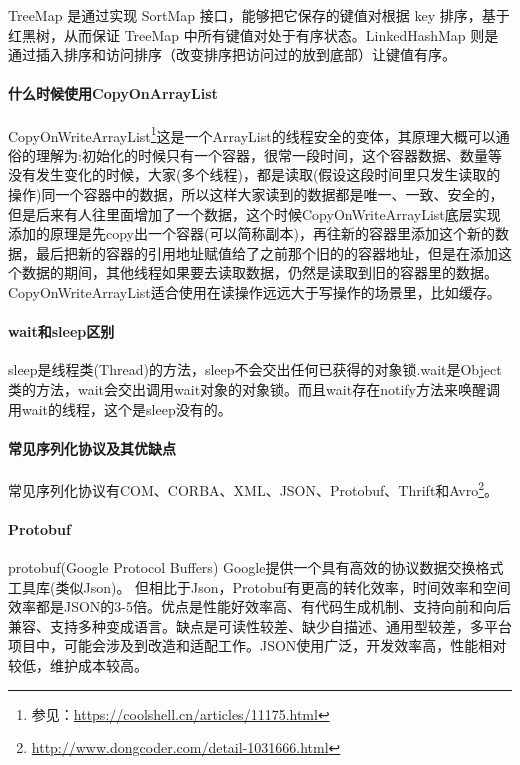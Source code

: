 \documentclass[../../../interview-questions.tex]{subfiles}
\begin{document}
TreeMap 是通过实现 SortMap 接口，能够把它保存的键值对根据 key 排序，基于红黑树，从而保证 TreeMap 中所有键值对处于有序状态。LinkedHashMap 则是通过插入排序和访问排序（改变排序把访问过的放到底部）让键值有序。

\paragraph{什么时候使用CopyOnArrayList}

CopyOnWriteArrayList\footnote{参见：\url{https://coolshell.cn/articles/11175.html}}这是一个ArrayList的线程安全的变体，其原理大概可以通俗的理解为:初始化的时候只有一个容器，很常一段时间，这个容器数据、数量等没有发生变化的时候，大家(多个线程)，都是读取(假设这段时间里只发生读取的操作)同一个容器中的数据，所以这样大家读到的数据都是唯一、一致、安全的，但是后来有人往里面增加了一个数据，这个时候CopyOnWriteArrayList底层实现添加的原理是先copy出一个容器(可以简称副本)，再往新的容器里添加这个新的数据，最后把新的容器的引用地址赋值给了之前那个旧的的容器地址，但是在添加这个数据的期间，其他线程如果要去读取数据，仍然是读取到旧的容器里的数据。CopyOnWriteArrayList适合使用在读操作远远大于写操作的场景里，比如缓存。

\paragraph{wait和sleep区别}

sleep是线程类(Thread)的方法，sleep不会交出任何已获得的对象锁.wait是Object类的方法，wait会交出调用wait对象的对象锁。而且wait存在notify方法来唤醒调用wait的线程，这个是sleep没有的。

\paragraph{常见序列化协议及其优缺点}

常见序列化协议有COM、CORBA、XML、JSON、Protobuf、Thrift和Avro\footnote{\url{http://www.dongcoder.com/detail-1031666.html}}。

\paragraph{Protobuf}protobuf(Google Protocol Buffers)
Google提供一个具有高效的协议数据交换格式工具库(类似Json)。
但相比于Json，Protobuf有更高的转化效率，时间效率和空间效率都是JSON的3-5倍。优点是性能好效率高、有代码生成机制、支持向前和向后兼容、支持多种变成语言。缺点是可读性较差、缺少自描述、通用型较差，多平台项目中，可能会涉及到改造和适配工作。JSON使用广泛，开发效率高，性能相对较低，维护成本较高。
\end{document}
